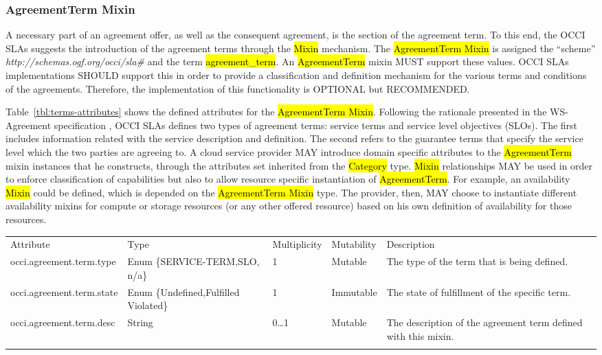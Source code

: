 \documentclass[10pt,a4paper]{article}
\begin{document}
\subsubsection{AgreementTerm Mixin}
A necessary part of an agreement offer, as well as the consequent agreement, is the section of the agreement term. To this end, the OCCI SLAs suggests the introduction of the agreement terms through the \hl{Mixin} mechanism. The \hl{AgreementTerm Mixin} is assigned the “scheme” \textit{http://schemas.ogf.org/occi/sla\#} and the term \hl{agreement\_term}. An \hl{AgreementTerm} mixin MUST support these values. OCCI SLAs implementations SHOULD support this in order to provide a classification and definition mechanism for the various terms and conditions of the agreements. Therefore, the implementation of this functionality is OPTIONAL but RECOMMENDED.

Table~\ref{tbl:terms-attributes} shows the defined attributes for the \hl{AgreementTerm Mixin}. Following the rationale presented in the WS-Agreement specification \cite{ws-agreeement:2007} , OCCI SLAs defines two types of agreement terms: service terms and service level objectives (SLOs). The first includes information related with the service description and definition. The second refers to the guarantee terms that specify the service level which the two parties are agreeing to. A cloud service provider MAY introduce domain specific attributes to the \hl{AgreementTerm} mixin instances that he constructs, through the attributes set inherited from the \hl{Category} type. \hl{Mixin} relationships MAY be used in order to enforce classification of capabilities but also to allow resource specific instantiation of \hl{AgreementTerm}. For example, an availability \hl{Mixin} could be defined, which is depended on the \hl{AgreementTerm Mixin} type. The provider, then, MAY choose to instantiate different availability mixins for compute or storage resources (or any other offered resource) based on his own definition of availability for those resources.



{
	\begin{tabular}{lp{2.5cm}p{1cm}lp{6cm}}
	\toprule
	Attribute&Type&Multi\-plicity&Mutability&Description\\
	\colrule
	occi.agreement.term.type & Enum \{SERVICE-TERM,SLO, n/a\} & 1 & Mutable & The type of the term that is being defined.\\
	occi.agreement.term.state & Enum \{Undefined,Fulfilled  Violated\} & 1 & Immutable & The state of fulfillment of the specific term. \\
	occi.agreement.term.desc & String & 0\ldots1 & Mutable & The description of the agreement term defined with this mixin. \\
	\botrule
	\end{tabular}
}
\end{document}
